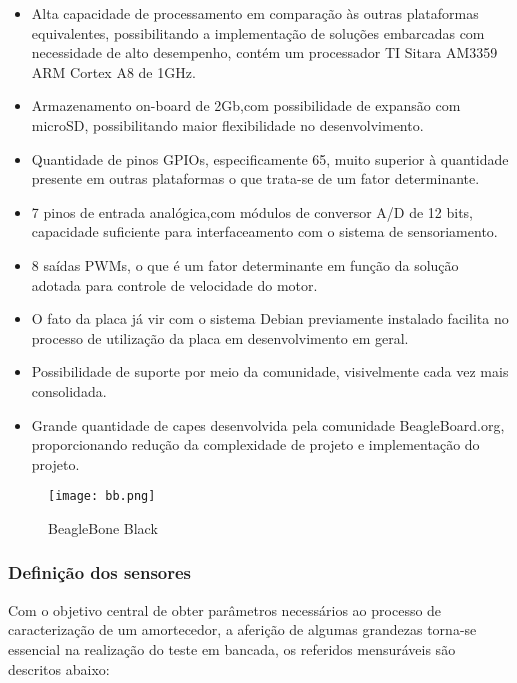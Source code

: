 	\begin{itemize}

		\item Alta capacidade de processamento em comparação às outras plataformas equivalentes, possibilitando a implementação de soluções embarcadas com necessidade de alto desempenho, contém um processador TI Sitara AM3359 ARM Cortex A8 de 1GHz.

		\item Armazenamento on-board de 2Gb,com possibilidade de expansão com microSD, possibilitando maior flexibilidade no desenvolvimento.

		\item Quantidade de pinos GPIOs, especificamente 65, muito superior à quantidade presente em outras plataformas o que trata-se de um fator determinante.

		\item 7 pinos de entrada analógica,com módulos de conversor A/D de 12 bits, capacidade suficiente para interfaceamento com o sistema de sensoriamento.

		\item 8 saídas PWMs, o que é um fator determinante em função da solução adotada para controle de velocidade do motor.

		\item O fato da placa já vir com o sistema Debian previamente instalado facilita no processo de utilização da placa em desenvolvimento em geral.

		\item Possibilidade de suporte por meio da comunidade, visivelmente cada vez mais consolidada.

		\item Grande quantidade de capes desenvolvida pela comunidade BeagleBoard.org, proporcionando redução da complexidade de projeto e implementação do projeto.

	\end{itemize}

	\begin{figure}[!h]
		\centering
		\texttt{[image: bb.png]}
		\caption{BeagleBone Black}
		\label{beaglebone}
	\end{figure}	

\subsubsection{Definição dos sensores}

	Com o objetivo central de obter parâmetros necessários ao processo de caracterização de um amortecedor, a aferição de algumas grandezas torna-se essencial na realização do teste em bancada, os referidos mensuráveis são descritos abaixo:

